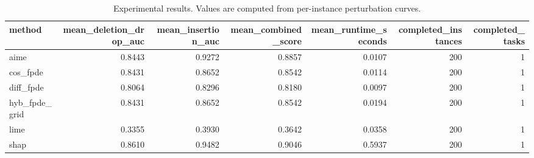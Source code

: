 \begin{table}[t]
\caption{Experimental results. Values are computed from per-instance perturbation curves.}
\label{tab:main_results_computed}
\centering
\begin{tabular}{lrrrrrr}
\toprule
method & mean\_deletion\_drop\_auc & mean\_insertion\_auc & mean\_combined\_score & mean\_runtime\_seconds & completed\_instances & completed\_tasks \\
\midrule
aime & 0.8443 & 0.9272 & 0.8857 & 0.0107 & 200 & 1 \\
cos\_fpde & 0.8431 & 0.8652 & 0.8542 & 0.0114 & 200 & 1 \\
diff\_fpde & 0.8064 & 0.8296 & 0.8180 & 0.0097 & 200 & 1 \\
hyb\_fpde\_grid & 0.8431 & 0.8652 & 0.8542 & 0.0194 & 200 & 1 \\
lime & 0.3355 & 0.3930 & 0.3642 & 0.0358 & 200 & 1 \\
shap & 0.8610 & 0.9482 & 0.9046 & 0.5937 & 200 & 1 \\
\bottomrule
\end{tabular}

\end{table}
